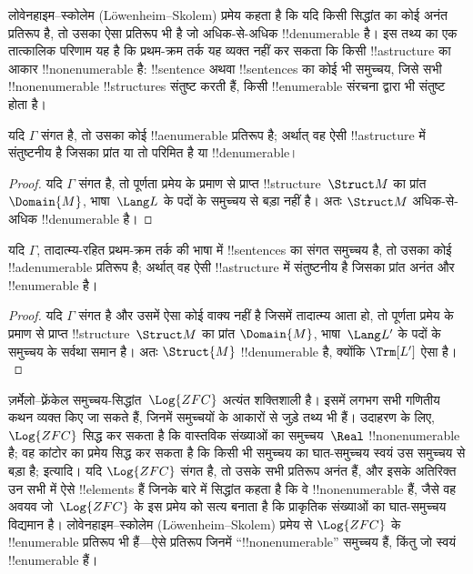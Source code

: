 \documentclass[../../../include/open-logic-section]{subfiles}
\begin{document}

लोवेनहाइम--स्कोलेम (L\"owenheim--Skolem) प्रमेय कहता है कि यदि किसी
सिद्धांत का कोई अनंत प्रतिरूप है, तो उसका ऐसा प्रतिरूप भी है जो अधिक-से-अधिक
!!{denumerable} है। इस तथ्य का एक तात्कालिक परिणाम यह है कि प्रथम-क्रम तर्क
यह व्यक्त नहीं कर सकता कि किसी !!a{structure} का आकार !!{nonenumerable} है:
!!{sentence} अथवा !!{sentence}s का कोई भी समुच्चय, जिसे सभी
!!{nonenumerable} !!{structure}s संतुष्ट करती हैं, किसी !!{enumerable}
संरचना द्वारा भी संतुष्ट होता है।

\begin{thm} 
 यदि $\Gamma$ संगत है, तो उसका कोई
!!a{enumerable} प्रतिरूप है; अर्थात् वह ऐसी !!a{structure} में संतुष्टनीय है
जिसका प्रांत या तो परिमित है या !!{denumerable}।
\end{thm}

\begin{proof}
यदि $\Gamma$ संगत है, तो पूर्णता प्रमेय के प्रमाण से प्राप्त
!!{structure}~$\Struct M$ का प्रांत $\Domain{M}$, भाषा~$\Lang L$ के पदों के
समुच्चय से बड़ा नहीं है। अतः $\Struct M$ अधिक-से-अधिक !!{denumerable} है।
\end{proof}

\begin{thm}
 यदि $\Gamma$, तादात्म्य-रहित प्रथम-क्रम तर्क की भाषा
में !!{sentence}s का संगत समुच्चय है, तो उसका कोई !!a{denumerable} प्रतिरूप
है; अर्थात् वह ऐसी !!a{structure} में संतुष्टनीय है जिसका प्रांत अनंत और
!!{enumerable} है।
\end{thm}

\begin{proof}
यदि $\Gamma$ संगत है और उसमें ऐसा कोई वाक्य नहीं है जिसमें तादात्म्य आता हो,
तो पूर्णता प्रमेय के प्रमाण से प्राप्त !!{structure}~$\Struct M$ का प्रांत
$\Domain{M}$, भाषा~$\Lang L'$ के पदों के समुच्चय के सर्वथा समान है। अतः
$\Struct{M}$ !!{denumerable} है, क्योंकि $\Trm[L']$ ऐसा है।
\end{proof}

\begin{ex}[स्कोलेम का विरोधाभास]
ज़र्मेलो--फ़्रेंकेल समुच्चय-सिद्धांत~$\Log{ZFC}$ अत्यंत शक्तिशाली है। इसमें
लगभग सभी गणितीय कथन व्यक्त किए जा सकते हैं, जिनमें समुच्चयों के आकारों से
जुड़े तथ्य भी हैं। उदाहरण के लिए, $\Log{ZFC}$ सिद्ध कर सकता है कि
वास्तविक संख्याओं का समुच्चय~$\Real$ !!{nonenumerable} है; वह कांटोर का
प्रमेय सिद्ध कर सकता है कि किसी भी समुच्चय का घात-समुच्चय स्वयं उस समुच्चय
से बड़ा है; इत्यादि। यदि $\Log{ZFC}$ संगत है, तो उसके सभी प्रतिरूप अनंत हैं,
और इसके अतिरिक्त उन सभी में ऐसे !!{element}s हैं जिनके बारे में सिद्धांत
कहता है कि वे !!{nonenumerable} हैं, जैसे वह अवयव जो~$\Log{ZFC}$ के इस
प्रमेय को सत्य बनाता है कि प्राकृतिक संख्याओं का घात-समुच्चय विद्यमान है।
लोवेनहाइम--स्कोलेम (L\"owenheim--Skolem) प्रमेय से $\Log{ZFC}$ के
!!{enumerable} प्रतिरूप भी हैं---ऐसे प्रतिरूप जिनमें ``!!{nonenumerable}''
समुच्चय हैं, किंतु जो स्वयं !!{enumerable} हैं।
\end{ex}
\end{document}
